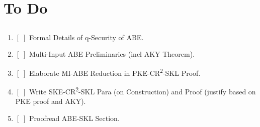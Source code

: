 \section{To Do}

\subsection*{\nikhil{}}

\begin{enumerate}
\item $[\;]$ Formal Details of q-Security of ABE.
\item $[\;]$ Multi-Input ABE Preliminaries (incl AKY Theorem).
\item $[\;]$ Elaborate MI-ABE Reduction in
    PKE-CR\textsuperscript{2}-SKL Proof.
\item $[\;]$ Write SKE-CR\textsuperscript{2}-SKL Para (on
Construction) and Proof (justify based on PKE proof and AKY).
\item $[\;]$ Proofread ABE-SKL Section.
\end{enumerate}